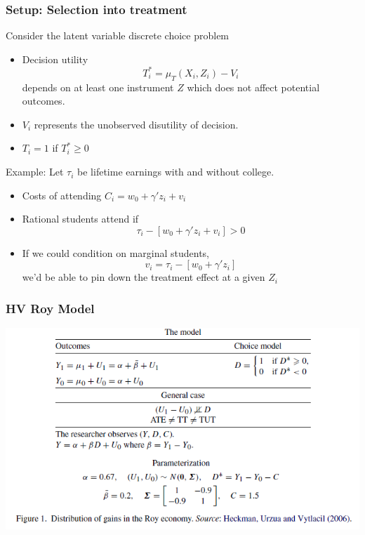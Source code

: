 \begin{frame}
  \frametitle{Setup: Selection into treatment}
  \vspace{-8pt}
  Consider the latent variable discrete choice problem 
  \begin{itemize}
    \item Decision utility $$T_i^* = \mu_T(X_i,Z_i) - V_i$$ depends on at least one instrument $Z$ which does not affect potential outcomes. 
    \item $V_i$ represents the unobserved disutility of decision. 
    \item $T_i = 1$ if $T_i^* \ge 0$ 
  \end{itemize}
  
  Example: Let $\tau_i$ be lifetime earnings with and without college. 
    \begin{itemize}
      \item Costs of attending $C_i = w_0 + \gamma'z_i + v_{i}$
      \item Rational students attend if $$ \tau_i - [w_0 + \gamma'z_i + v_{i}] > 0$$
      \item If we could condition on marginal students, 
          $$v_{i} = \tau_i - [w_0 + \gamma'z_i]$$
      we'd be able to pin down the treatment effect at a given $Z_i$   
    \end{itemize}
\end{frame}


\begin{frame}
  \frametitle{HV Roy Model}
  \begin{center}
    \includegraphics[width=.9\textwidth]{./resources/HVRoyModel}
  \end{center}  
\end{frame}


